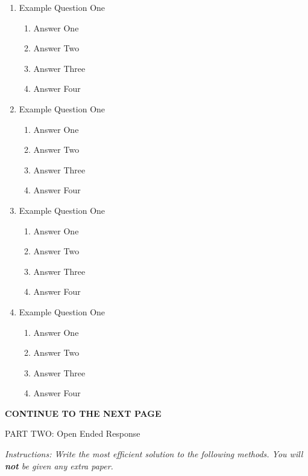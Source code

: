 \documentclass[11pt,fleqn]{article}
\begin{document}
\begin{enumerate}
\begin{enumerate}
	\end{enumerate}
\item Example Question One
	\begin{enumerate}
	\item Answer One
	\item Answer Two
	\item Answer Three
	\item Answer Four
	\end{enumerate}
\item Example Question One
	\begin{enumerate}
	\item Answer One
	\item Answer Two
	\item Answer Three
	\item Answer Four
	\end{enumerate}
\item Example Question One
	\begin{enumerate}
	\item Answer One
	\item Answer Two
	\item Answer Three
	\item Answer Four
	\end{enumerate}
\item Example Question One
	\begin{enumerate}
	\item Answer One
	\item Answer Two
	\item Answer Three
	\item Answer Four
	\end{enumerate}
\end{enumerate}

\vfill
\begin{center}
\textbf{CONTINUE TO THE NEXT PAGE}
\end{center}

\newpage

\begin{center}
\begin{large}
PART TWO: Open Ended Response
\end{large}
\end{center}
\textit{Instructions: Write the most efficient solution to the following methods. You will \textbf{not} be given any extra paper.}
\end{document}
